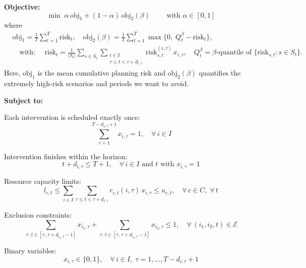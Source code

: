 \vspace{1em}


\noindent\textbf{Objective:}
\begin{equation}
\min \; \alpha\,\mathrm{obj}_1 + (1-\alpha)\,\mathrm{obj}_2(\beta) \qquad \text{ with }\alpha \in [0,1]
\label{eq:objective}
\end{equation}
where
\[
\begin{aligned}
&\mathrm{obj}_1 = \frac{1}{T}\sum_{t=1}^{T} \mathrm{risk}_t,\quad \mathrm{obj}_2(\beta) = \frac{1}{T}\sum_{t=1}^{T} \max\Big\{0,\;Q_t^\beta-\mathrm{risk}_t\Big\},\\[1ex]
&\quad\text{with: }\quad\mathrm{risk}_t = \frac{1}{|S_t|}\sum_{s\in S_t}\sum_{\substack{i\in I\\ \tau \le t < \tau+d_{i,\tau}}} \mathrm{risk}_{s,t}^{(i,\tau)}\,x_{i,\tau},\quad Q_t^\beta=\beta\text{-quantile of } \Big\{\mathrm{risk}_{s,t} : s\in S_t\Big\}.
\end{aligned}
\]
\noindent Here, $\mathrm{obj}_1$ is the mean cumulative planning risk and $\mathrm{obj}_2(\beta)$ quantifies the extremely high-risk scenarios and periods we want to avoid.

\vspace{1em}
\noindent\textbf{Subject to:}

\noindent Each intervention is scheduled exactly once:
\[
\sum_{\tau=1}^{T-d_{i,\tau}+1} x_{i,\tau} = 1,\quad \forall\, i\in I
\]

\noindent Intervention finishes within the horizon:
\[
t + d_{i,\tau} \le T+1,\quad \forall\, i\in I \text{ and } t \text{ with } x_{i,\tau}=1
\]

\noindent Resource capacity limits:
\[
l_{c,t} \le \sum_{i\in I}\sum_{\tau \le t < \tau+d_{i,\tau}} r_{c,t}(i,\tau)\,x_{i,\tau} \le u_{c,t},\quad \forall\, c\in C,\; \forall\, t
\]

\noindent Exclusion constraints:
\[
\sum_{\tau:\, t\in [\tau,\,\tau+d_{i_1,\tau}-1]} x_{i_1,\tau} + \sum_{\tau:\, t\in [\tau,\,\tau+d_{i_2,\tau}-1]} x_{i_2,\tau} \le 1,\quad \forall\,(i_1,i_2,t)\in \mathcal{E}
\]

\noindent Binary variables:
\[
x_{i,\tau} \in \{0,1\},\quad \forall\, i\in I,\; \tau=1,\ldots,T-d_{i,\tau}+1
\]


